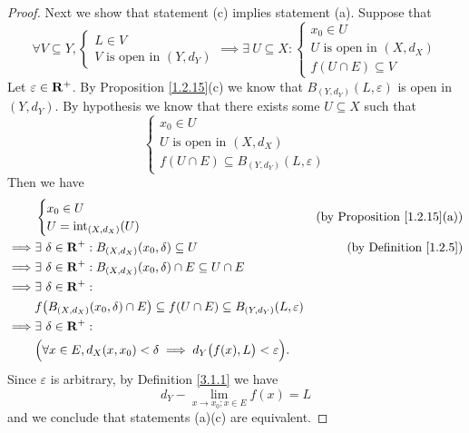 \begin{proof}
    Next we show that statement (c) implies statement (a).
    Suppose that
    \[
        \forall V \subseteq Y, \begin{cases}
            L \in V \\
            V \text{ is open in } (Y, d_Y)
        \end{cases} \implies \exists\ U \subseteq X : \begin{cases}
            x_0 \in U                      \\
            U \text{ is open in } (X, d_X) \\
            f(U \cap E) \subseteq V
        \end{cases}
    \]
    Let \(\varepsilon \in \mathbf{R}^+\).
    By Proposition \ref{1.2.15}(c) we know that \(B_{(Y, d_Y)}(L, \varepsilon)\) is open in \((Y, d_Y)\).
    By hypothesis we know that there exists some \(U \subseteq X\) such that
    \[
        \begin{cases}
            x_0 \in U                      \\
            U \text{ is open in } (X, d_X) \\
            f(U \cap E) \subseteq B_{(Y, d_Y)}(L, \varepsilon)
        \end{cases}
    \]
    Then we have
    \begin{align*}
                 & \begin{cases}
                       x_0 \in U \\
                       U = \text{int}_{(X, d_X)}(U)
                   \end{cases}                                                                             & \text{(by Proposition \ref{1.2.15}(a))}             \\
        \implies & \exists\ \delta \in \mathbf{R}^+ : B_{(X, d_X)}(x_0, \delta) \subseteq U                                         & \text{(by Definition \ref{1.2.5})} \\
        \implies & \exists\ \delta \in \mathbf{R}^+ : B_{(X, d_X)}(x_0, \delta) \cap E \subseteq U \cap E                                                                \\
        \implies & \exists\ \delta \in \mathbf{R}^+ :                                                                                                                    \\
                 & f\big(B_{(X, d_X)}(x_0, \delta) \cap E\big) \subseteq f(U \cap E) \subseteq B_{(Y, d_Y)}(L, \varepsilon)                                      \\
        \implies & \exists\ \delta \in \mathbf{R}^+ :                                                                                                                    \\
                 & \Big(\forall x \in E, d_X(x, x_0) < \delta \implies d_Y\big(f(x), L\big) < \varepsilon\Big).
    \end{align*}
    Since \(\varepsilon\) is arbitrary, by Definition \ref{3.1.1} we have
    \[
        d_Y - \lim_{x \to x_0 ; x \in E} f(x) = L
    \]
    and we conclude that statements (a)(c) are equivalent.


\end{proof}
